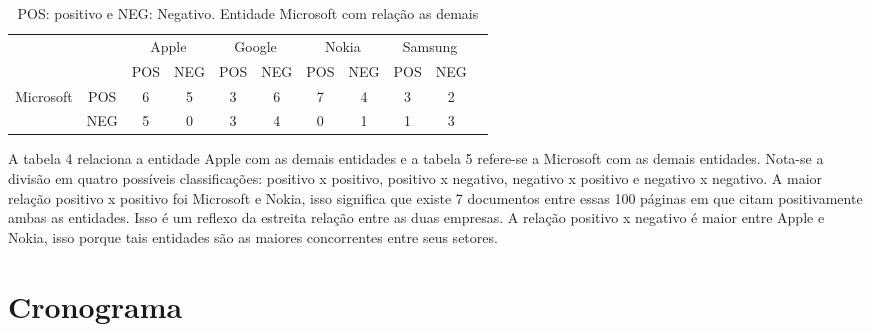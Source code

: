 \documentclass[a4paper,12pt]{article}
\begin{document}
\begin{table}
\begin{center}
	\begin{tabular}{cc|c|c|c|c|c|c|c|c|l}
	\cline{3-10}
	& & \multicolumn{2}{|c|}{Apple} & \multicolumn{2}{|c|}{Google} & \multicolumn{2}{|c|}{Nokia} & \multicolumn{2}{|c|}{Samsung} \\ \cline{3-10}
	& & \multicolumn{1}{|c|}{POS} & \multicolumn{1}{|c|}{NEG} & \multicolumn{1}{|c|}{POS} & \multicolumn{1}{|c|}{NEG} & \multicolumn{1}{|c|}{POS} & \multicolumn{1}{|c|}{NEG} & \multicolumn{1}{|c|}{POS} & \multicolumn{1}{|c|}{NEG} \\ \cline{1-10}
	\multicolumn{1}{|c|}{\multirow{2}{*}{Microsoft}} &
	\multicolumn{1}{|c|}{POS} & 6 & 5 & 3 & 6 & 7 & 4 & 3 & 2  \\ \cline{2-10}
	\multicolumn{1}{|c|}{}                        &
	\multicolumn{1}{|c|}{NEG} & 5 & 0 & 3 & 4 & 0 & 1 & 1  & 3   \\ \cline{1-10}
	\end{tabular}
  \caption{POS: positivo e NEG: Negativo. Entidade Microsoft com relação as demais}
\end{center}
\end{table}

A tabela 4 relaciona a entidade Apple com as demais entidades e a tabela 5 refere-se a Microsoft com as demais entidades. Nota-se a divisão em quatro possíveis classificações: positivo x positivo, positivo x negativo, negativo x positivo e negativo x negativo. A maior relação positivo x positivo foi Microsoft e Nokia, isso significa que existe 7 documentos entre essas 100 páginas em que citam positivamente ambas as entidades. Isso é um reflexo da estreita relação entre as duas empresas. A relação positivo x negativo é maior entre Apple e Nokia, isso porque tais entidades são as maiores concorrentes entre seus setores. 

\newpage

\section{Cronograma}
\end{document}
